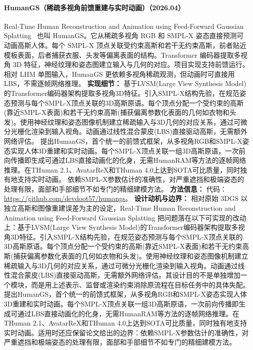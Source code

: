 \paragraph{HumanGS（稀疏多视角前馈重建与实时动画）（2026.04）}
Real-Time Human Reconstruction and Animation using Feed-Forward Gaussian Splatting~\cite{2604_10259} 也叫 HumanGS。它从稀疏多视角 RGB 和 SMPL-X 姿态直接预测可动画高斯人体。每个 SMPL-X 顶点关联受约束高斯和若干无约束高斯，前者贴近模板表面，后者捕获衣服、头发等偏离表面的结构。Transformer 编码器提取多视角 3D 特征，神经纹理和姿态图建立输入与几何的对应。项目实现支持前馈运行。相对 LHM 单图输入，HumanGS 更依赖多视角稀疏观测，但动画时可直接用 LBS，不需逐帧网络推理。
\textbf{实现细节：} 基于LVSM(Large View Synthesis Model)的Transformer编码器架构提取多视角3D特征。引入SMPL-X结构先验，在规范姿态预测与每个SMPL-X顶点关联的3D高斯原语。每个顶点分配一个受约束的高斯(靠近SMPL-X表面)和若干无约束高斯(捕获偏离参数化表面的几何如衣物和头发)。使用神经纹理和姿态图像机制建立稀疏输入与3D几何的对应关系，通过可微分光栅化渲染到输入视角。动画通过线性混合蒙皮(LBS)直接驱动高斯，无需额外网络评估。 提出HumanGS，首个统一的前馈式框架，从多视角RGB和SMPL-X姿态实现人体3D重建和实时动画。每个SMPL-X顶点关联一组3D高斯原语，一次前向传播即生成可通过LBS直接动画化的化身，无需HumanRAM等方法的逐帧网络推理。在THuman 2.1、AvatarReX和THuman 4.0上达到SOTA可比质量，同时独有地支持实时动画。 依赖SMPL-X参数估计的准确性，对严重遮挡和极端姿态的处理有限，面部和手部细节不如专门的精细建模方法。
\textbf{方法信息：} 代码：\url{https://github.com/devdoot57/humangs}。
\textbf{设计动机与边界：} 相对原始 3DGS 以独立高斯和图像重建误差为主的设定，Real-Time Human Reconstruction and Animation using Feed-Forward Gaussian Splatting 把问题落在以下可实现的改动上：基于LVSM(Large View Synthesis Model)的Transformer编码器架构提取多视角3D特征。引入SMPL-X结构先验，在规范姿态预测与每个SMPL-X顶点关联的3D高斯原语。每个顶点分配一个受约束的高斯(靠近SMPL-X表面)和若干无约束高斯(捕获偏离参数化表面的几何如衣物和头发)。使用神经纹理和姿态图像机制建立稀疏输入与3D几何的对应关系，通过可微分光栅化渲染到输入视角。动画通过线性混合蒙皮(LBS)直接驱动高斯，无需额外网络评估。其设计目的不是单独增加一个模块，而是用上述表示、监督或渲染约束消除原流程在目标任务中的具体失配。提出HumanGS，首个统一的前馈式框架，从多视角RGB和SMPL-X姿态实现人体3D重建和实时动画。每个SMPL-X顶点关联一组3D高斯原语，一次前向传播即生成可通过LBS直接动画化的化身，无需HumanRAM等方法的逐帧网络推理。在THuman 2.1、AvatarReX和THuman 4.0上达到SOTA可比质量，同时独有地支持实时动画。适用时还应保留论文给出的边界：依赖SMPL-X参数估计的准确性，对严重遮挡和极端姿态的处理有限，面部和手部细节不如专门的精细建模方法。

